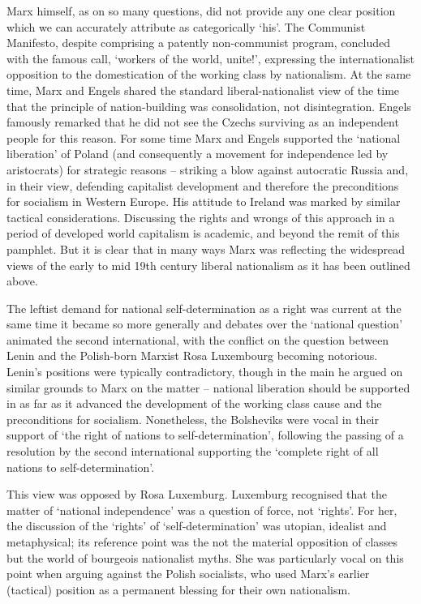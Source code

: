 Marx himself, as on so many questions, did not provide any one clear position which we can accurately attribute as categorically ‘his’. The Communist Manifesto, despite comprising a patently non-communist program, concluded with the famous call, ‘workers of the world, unite!’, expressing the internationalist opposition to the domestication of the working class by nationalism. At the same time, Marx and Engels shared the standard liberal-nationalist view of the time that the principle of nation-building was consolidation, not disintegration. Engels famously remarked that he did not see the Czechs surviving as an independent people for this reason. For some time Marx and Engels supported the ‘national liberation’ of Poland (and consequently a movement for independence led by aristocrats) for strategic reasons – striking a blow against autocratic Russia and, in their view, defending capitalist development and therefore the preconditions for socialism in Western Europe. His attitude to Ireland was marked by similar tactical considerations. Discussing the rights and wrongs of this approach in a period of developed world capitalism is academic, and beyond the remit of this pamphlet. But it is clear that in many ways Marx was reflecting the widespread views of the early to mid 19th century liberal nationalism as it has been outlined above.

The leftist demand for national self-determination as a right was current at the same time it became so more generally and debates over the ‘national question’ animated the second international, with the conflict on the question between Lenin and the Polish-born Marxist Rosa Luxembourg becoming notorious. Lenin’s positions were typically contradictory, though in the main he argued on similar grounds to Marx on the matter – national liberation should be supported in as far as it advanced the development of the working class cause and the preconditions for socialism. Nonetheless, the Bolsheviks were vocal in their support of ‘the right of nations to self-determination’, following the passing of a resolution by the second international supporting the ‘complete right of all nations to self-determination’.

This view was opposed by Rosa Luxemburg. Luxemburg recognised that the matter of ‘national independence’ was a question of force, not ‘rights’. For her, the discussion of the ‘rights’ of ‘self-determination’ was utopian, idealist and metaphysical; its reference point was the not the material opposition of classes but the world of bourgeois nationalist myths. She was particularly vocal on this point when arguing against the Polish socialists, who used Marx’s earlier (tactical) position as a permanent blessing for their own nationalism.

